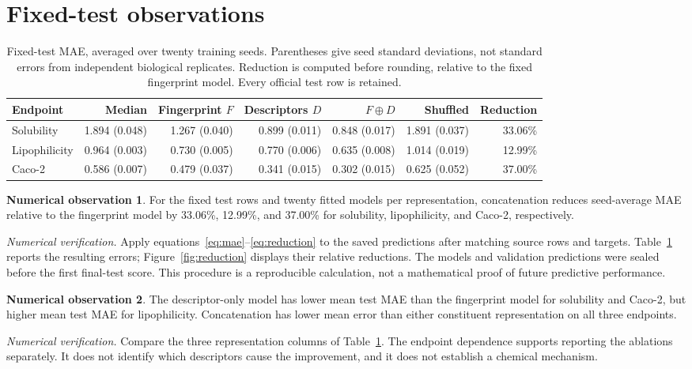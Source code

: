 \documentclass[10pt,twocolumn,a4paper]{article}
\theoremstyle{definition}\newtheorem{observation}{Numerical observation}
\theoremstyle{remark}\newtheorem{remark}{Remark}
\begin{document}
\section{Fixed-test observations}\label{sec:results}
\begin{table}[t]
\centering
\caption{Fixed-test MAE, averaged over twenty training seeds. Parentheses give seed standard deviations, not standard errors from independent biological replicates. Reduction is computed before rounding, relative to the fixed fingerprint model. Every official test row is retained.}\label{tab:test}
\small
\begin{tabular}{lrrrrrr}\toprule
Endpoint & Median & Fingerprint $F$ & Descriptors $D$ & $F\oplus D$ & Shuffled & Reduction\\\midrule
Solubility & 1.894 (0.048) & 1.267 (0.040) & 0.899 (0.011) & 0.848 (0.017) & 1.891 (0.037) & 33.06\%\\
Lipophilicity & 0.964 (0.003) & 0.730 (0.005) & 0.770 (0.006) & 0.635 (0.008) & 1.014 (0.019) & 12.99\%\\
Caco-2 & 0.586 (0.007) & 0.479 (0.037) & 0.341 (0.015) & 0.302 (0.015) & 0.625 (0.052) & 37.00\%\\
\bottomrule\end{tabular}
\end{table}
\begin{observation}\label{obs:test}
For the fixed test rows and twenty fitted models per representation, concatenation reduces seed-average MAE relative to the fingerprint model by 33.06\%, 12.99\%, and 37.00\% for solubility, lipophilicity, and Caco-2, respectively.
\end{observation}
\noindent\textit{Numerical verification.} Apply equations~\eqref{eq:mae}--\eqref{eq:reduction} to the saved predictions after matching source rows and targets. Table~\ref{tab:test} reports the resulting errors; Figure~\ref{fig:reduction} displays their relative reductions. The models and validation predictions were sealed before the first final-test score. This procedure is a reproducible calculation, not a mathematical proof of future predictive performance.

\begin{observation}\label{obs:ablation}
The descriptor-only model has lower mean test MAE than the fingerprint model for solubility and Caco-2, but higher mean test MAE for lipophilicity. Concatenation has lower mean error than either constituent representation on all three endpoints.
\end{observation}
\noindent\textit{Numerical verification.} Compare the three representation columns of Table~\ref{tab:test}. The endpoint dependence supports reporting the ablations separately. It does not identify which descriptors cause the improvement, and it does not establish a chemical mechanism.
\end{document}
